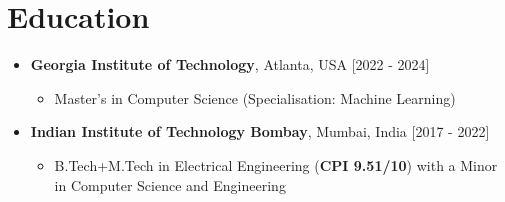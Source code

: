 \documentclass[10pt,letterpaper,sans]{moderncv}
\begin{document}
\renewcommand{\labelitemi}{$\bullet$}
\renewcommand{\itemhook}{\setlength{\topsep}{0pt}\setlength{\partopsep}{0pt}\setlength{\parsep}{0pt}\setlength{\itemsep}{0pt}}
\renewcommand{\itemhooki}{\setlength{\itemsep}{0.45em}}
\makecvtitle
\section{Education}
\begin{itemize}
\item \textbf{Georgia Institute of Technology}, Atlanta, USA \hfill{[2022 - 2024]}
\begin{itemize}
    \item Master's in Computer Science (Specialisation: Machine Learning)
\end{itemize}
\item \textbf{Indian Institute of Technology Bombay}, Mumbai, India \hfill{[2017 - 2022]}
\begin{itemize}
    \item B.Tech+M.Tech in Electrical Engineering (\textbf{CPI 9.51/10}) with a Minor in Computer Science and Engineering
\end{itemize}
\end{itemize}
\renewcommand{\itemhooki}{\setlength{\itemsep}{1.0em}}
\end{document}
